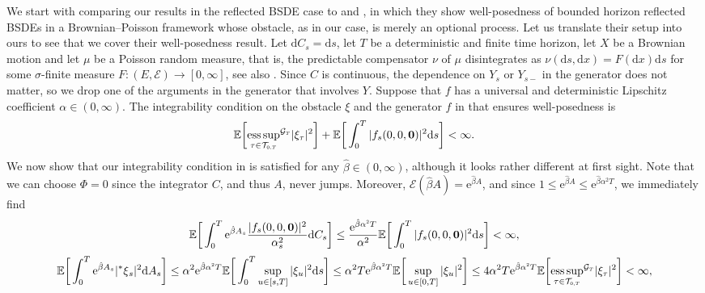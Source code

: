 \documentclass[10pt]{article} %
\newcommand\cE{\mathcal E}
\newcommand\cG{\mathcal G}
\newcommand\cT{\mathcal T}
\newcommand{\smalltext}[1]{\text{\fontsize{4}{4}\selectfont$#1$}}
\def \E{\mathbb{E}}
\newcommand{\brs}[1]{\prescript{\ast}{}{#1}}
\newcommand{\1}{\mathbf{1}}
\def\d{\mathrm{d}}
\DeclareMathOperator*{\esssup}{ess\,sup}
\begin{document}
We start with comparing our results in the reflected BSDE case to \citeauthor*{grigorova2017reflected} \cite{grigorova2017reflected} and \citeauthor*{grigorova2020optimal} \cite{grigorova2020optimal}, in which they show well-posedness of bounded horizon reflected BSDEs in a Brownian--Poisson framework whose obstacle, as in our case, is merely an optional process. Let us translate their setup into ours to see that we cover their well-posedness result. Let $\d C_s = \d s$, let $T$ be a deterministic and finite time horizon, let $X$ be a Brownian motion and let $\mu$ be a Poisson random measure, that is, the predictable compensator $\nu$ of $\mu$ disintegrates as $\nu(\d s, \d x) = F(\d x) \d s$ for some $\sigma$-finite measure $F : (E,\cE) \longrightarrow [0,\infty]$, see also \cite{jacod1979calcul,jacod2003limit}. Since $C$ is continuous, the dependence on $Y_s$ or $Y_{s-}$ in the generator does not matter, so we drop one of the arguments in the generator that involves $Y$. Suppose that $f$ has a universal and deterministic Lipschitz coefficient $\alpha \in (0,\infty)$. The integrability condition on the obstacle $\xi$ and the generator $f$ in \cite{grigorova2017reflected,grigorova2020optimal} that ensures well-posedness is
\begin{equation*}
	\E\bigg[{\esssup_{\tau \in \cT_{\smalltext{0}\smalltext{,}\smalltext{T}}}}^{\cG_\smalltext{T}}|\xi_\tau|^2\bigg] + \E \bigg[ \int_0^T |f_s(0,0,\mathbf{0})|^2 \d s \bigg] < \infty.
\end{equation*}
We now show that our integrability condition in  is satisfied for any $\hat\beta \in (0,\infty)$, although it looks rather different at first sight. Note that we can choose $\Phi = 0$ since the integrator $C$, and thus $A$, never jumps. Moreover, $\cE(\hat\beta A) = \mathrm{e}^{\hat\beta A}$, and since $1 \leq \mathrm{e}^{\hat\beta A} \leq \mathrm{e}^{\hat\beta\alpha^2T}$, we immediately find
\begin{equation*}
	\E\bigg[\int_0^T \mathrm{e}^{\hat\beta A_s} \frac{|f_s(0,0,\mathbf{0})|^2}{\alpha^2_s}\d C_s\bigg] \leq \frac{\mathrm{e}^{\hat\beta \alpha^\smalltext{2}T}}{\alpha^2} \E \bigg[\int_0^T |f_s(0,0,\mathbf{0})|^2\mathrm{d}s\bigg] < \infty,
\end{equation*}
\begin{equation*}
	\E\bigg[ \int_0^T \mathrm{e}^{\hat\beta A_s} |\!\brs{\xi}_s|^2 \d A_s \bigg]
	\leq \alpha^2\mathrm{e}^{\hat\beta \alpha^\smalltext{2} T}\E\bigg[ \int_0^T \sup_{u \in [s,T]}|\xi_u|^2 \d s \bigg] 
	\leq \alpha^2T\mathrm{e}^{\hat\beta \alpha^\smalltext{2} T}\E\bigg[ \sup_{u \in [0,T]}|\xi_u|^2 \bigg]  
	\leq 4\alpha^2T\mathrm{e}^{\hat\beta \alpha^\smalltext{2} T}\E \bigg[ {\esssup_{\tau \in \cT_{\smalltext{0}\smalltext{,}\smalltext{T}}}}^{\cG_\smalltext{T}} |\xi_\tau|^2 \bigg] < \infty,
\end{equation*}
\end{document}
